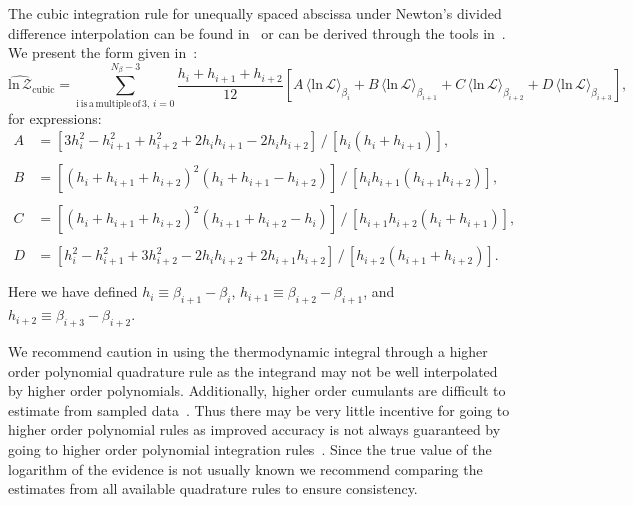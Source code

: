 The cubic integration rule for unequally spaced abscissa under Newton's divided difference interpolation can be found in~\cite{brun1953generalization,selmer1958numerical,chambers1989estimating} or can be derived through the tools in~\cite{abramowitz1965handbook}. We present the form given in~\cite{chambers1989estimating}:
\begin{equation}
    \widehat{\mathrm{ln} \, \mathcal{Z}}_{\mathrm{cubic}} = \sum_{\mathrm{i\, is\, a \, multiple \, of \, 3}, \, i=0}^{N_\beta-3} \frac{h_i + h_{i+1} + h_{i+2}}{12} \left [A \, \langle \mathrm{ln} \, \mathcal{L} \rangle_{\beta_{i}} + B \, \langle \mathrm{ln} \, \mathcal{L} \rangle_{\beta_{i+1}} + C \, \langle \mathrm{ln} \, \mathcal{L} \rangle_{\beta_{i+2}} + D \, \langle \mathrm{ln} \, \mathcal{L} \rangle_{\beta_{i+3}}\right ],
\end{equation}
for expressions:
\begin{equation}
\begin{array}{llll}
     A &= \left [3h_i^2 -h_{i+1}^2 +h_{i+2}^2 +2 h_i h_{i+1} - 2h_i h_{i+2}\right] \, / \, \left [h_i (h_i + h_{i+1}) \right ], \\ \\
     B &= \left [(h_i + h_{i+1} + h_{i+2})^2 (h_i + h_{i+1} - h_{i+2})\right ]  \, / \, \left[h_{i} h_{i+1} (h_{i+1} h_{i+2})\right ], \\ \\
     C &= \left [(h_i + h_{i+1} + h_{i+2})^2 (h_{i+1} + h_{i+2} - h_i)\right ] \, / \, \left [ h_{i+1} h_{i+2} (h_i + h_{i+1}) \right], \\ \\
     D &= \left [ h_i^2 - h_{i+1}^2 +3 h_{i+2}^2 - 2h_i h_{i+2} + 2 h_{i+1} h_{i+2}\right ] \, / \, \left [h_{i+2}(h_{i+1} + h_{i+2}) \right].\\ \\
\end{array}
\end{equation}
Here we have defined $h_i \equiv \beta_{i+1} - \beta_{i}$, $h_{i+1} \equiv \beta_{i+2} - \beta_{i+1}$, and $h_{i+2} \equiv \beta_{i+3} - \beta_{i+2}$.

We recommend caution in using the thermodynamic integral through a higher order polynomial quadrature rule as the integrand may not be well interpolated by higher order polynomials. Additionally, higher order cumulants are difficult to estimate from sampled data~\cite{kardar2007statistical}. Thus there may be very little incentive for going to higher order polynomial rules as improved accuracy is not always guaranteed by going to higher order polynomial integration rules~\citep{epperson1987runge}. Since the true value of the logarithm of the evidence is not usually known we recommend comparing the estimates from all available quadrature rules to ensure consistency.

